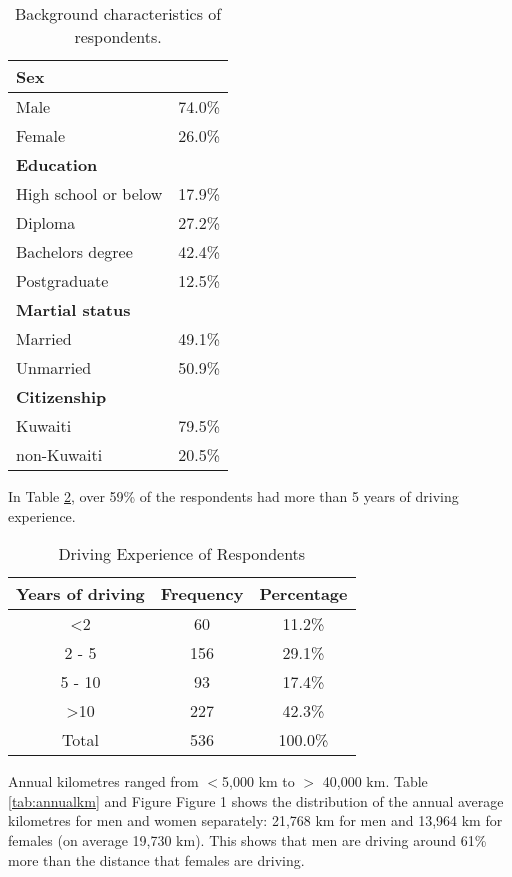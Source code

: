 \documentclass[preprint,12pt,a4paper,authoryear]{elsarticle}
\begin{document}
\begin{table}[H]
\centering
\caption{Background characteristics of respondents.}
\label{tb:respondents}
\begin{tabular}{@{}lc@{}}
\toprule
\textbf{Sex} &  \\ \midrule
Male & 74.0\% \\
Female & 26.0\% \\ \midrule
\textbf{Education} &  \\ \midrule
High school or below & 17.9\% \\
Diploma & 27.2\% \\
Bachelors degree & 42.4\% \\
Postgraduate & 12.5\% \\ \midrule
\textbf{Martial status} &  \\ \midrule
Married & 49.1\% \\
Unmarried & 50.9\% \\ \midrule
\textbf{Citizenship} &  \\ \midrule
Kuwaiti & 79.5\% \\
non-Kuwaiti & 20.5\% \\ \bottomrule
\end{tabular}
\end{table}

In Table \ref{tab:drive-exp}, over 59\% of the respondents had more than 5 years of driving experience.

\begin{table}[H]
\centering
\caption{Driving Experience of Respondents}
\label{tab:drive-exp}
\begin{tabular}{@{}ccc@{}}
\toprule
\textbf{Years of driving} & \textbf{Frequency} & \textbf{Percentage} \\ \midrule
\textless 2 & 60 & 11.2\% \\
2 - 5 & 156 & 29.1\% \\
5 - 10 & 93 & 17.4\% \\
\textgreater10 & 227 & 42.3\% \\
Total & 536 & 100.0\% \\ \bottomrule
\end{tabular}
\end{table}

Annual kilometres ranged from $<$5,000 km to $>$ 40,000 km. Table \ref{tab:annualkm} and Figure Figure 1 shows the distribution of the annual average kilometres for men and women separately: 21,768 km for men and 13,964 km for females (on average 19,730 km). This shows that men are driving around 61\% more than the distance that females are driving.
\end{document}
